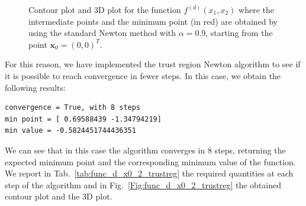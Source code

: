 \documentclass[a4paper,11pt]{article}
\begin{document}
	\begin{figure}[H]
		\centering
		 \quad
		\caption{Contour plot and 3D plot for the function $f^{(d)}(x_{1},x_{2})$ where the intermediate points and the minimum point (in red) are obtained by using the standard Newton method with $\alpha=0.9$, starting from the point $\textbf{x}_{0}=(0,0)^{T}$.}
		\label{Fig:func_d}
	\end{figure}

\noindent For this reason, we have implemented the trust region Newton algorithm to see if it is possible to reach convergence in fewer steps. In this case, we obtain the following results:
\begin{verbatim}
convergence = True, with 8 steps
min point = [ 0.69588439 -1.34794219]
min value = -0.5824451744436351
\end{verbatim}
We can see that in this case the algorithm converges in $8$ steps, returning the expected minimum point and the corresponding minimum value of the function. We report in Tab.~\ref{tab:func_d_x0_2_trustreg} the required quantities at each step of the algorithm and in Fig.~\ref{Fig:func_d_x0_2_trustreg} the obtained contour plot and the 3D plot.
\end{document}
